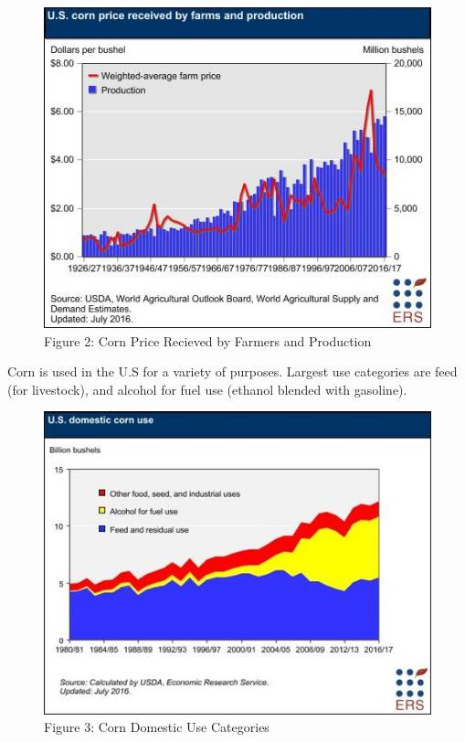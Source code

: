 \documentclass[]{book}
\theoremstyle{definition}
\theoremstyle{definition}
\theoremstyle{remark}
\begin{document}
\begin{figure}[htbp]
\centering
\includegraphics{images/Corn-PriceR-Production.png}
\caption{Figure 2: Corn Price Recieved by Farmers and Production}
\end{figure}

Corn is used in the U.S for a variety of purposes. Largest use
categories are feed (for livestock), and alcohol for fuel use (ethanol
blended with gasoline).

\begin{figure}[htbp]
\centering
\includegraphics{images/Corn-Domestic-Use.png}
\caption{Figure 3: Corn Domestic Use Categories}
\end{figure}
\end{document}
